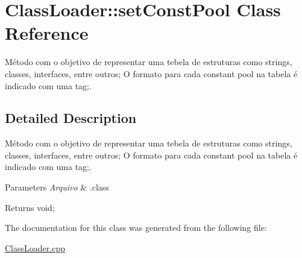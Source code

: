 \hypertarget{class_class_loader_1_1set_const_pool}{}\section{Class\+Loader\+:\+:set\+Const\+Pool Class Reference}
\label{class_class_loader_1_1set_const_pool}


Método com o objetivo de representar uma tebela de estruturas como strings, classes, interfaces, entre outros; O formato para cada constant pool na tabela é indicado com uma tag;.  




\subsection{Detailed Description}
Método com o objetivo de representar uma tebela de estruturas como strings, classes, interfaces, entre outros; O formato para cada constant pool na tabela é indicado com uma tag;. 


\begin{DoxyParams}{Parameters}
{\em Arquivo} & .class \\
\hline
\end{DoxyParams}
\begin{DoxyReturn}{Returns}
void; 
\end{DoxyReturn}


The documentation for this class was generated from the following file\+:\begin{DoxyCompactItemize}
\item 
\hyperlink{_class_loader_8cpp}{Class\+Loader.\+cpp}\end{DoxyCompactItemize}
